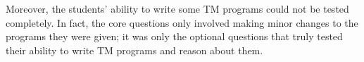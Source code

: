 Moreover, the students' ability to write some TM programs could not be tested completely. In fact, the core questions only involved making minor changes to the programs they were given; it was only the optional questions that truly tested their ability to write TM programs and reason about them. 


